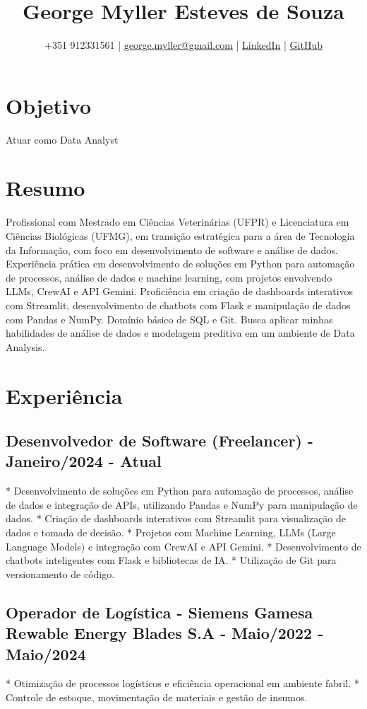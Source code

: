 \documentclass{article}
\title{George Myller Esteves de Souza}
\author{+351 912331561 | \href{mailto:george.myller@gmail.com}{george.myller@gmail.com} | \href{https://linkedin.com/in/george-m-souza}{LinkedIn} | \href{https://github.com/GeorgeMyller}{GitHub}}
\begin{document}
\maketitle

\section*{Objetivo}
 Atuar como Data Analyst

\section*{Resumo}
Profissional com Mestrado em Ciências Veterinárias (UFPR) e Licenciatura em Ciências Biológicas (UFMG), em transição estratégica para a área de Tecnologia da Informação, com foco em desenvolvimento de software e análise de dados. Experiência prática em desenvolvimento de soluções em Python para automação de processos, análise de dados e machine learning, com projetos envolvendo LLMs, CrewAI e API Gemini.  Proficiência em criação de dashboards interativos com Streamlit, desenvolvimento de chatbots com Flask e manipulação de dados com Pandas e NumPy.  Domínio básico de SQL e Git. Busca aplicar minhas habilidades de análise de dados e modelagem preditiva em um ambiente de Data Analysis.

\section*{Experiência}
\subsection*{Desenvolvedor de Software (Freelancer) - Janeiro/2024 - Atual}
* Desenvolvimento de soluções em Python para automação de processos, análise de dados e integração de APIs, utilizando Pandas e NumPy para manipulação de dados.
* Criação de dashboards interativos com Streamlit para visualização de dados e tomada de decisão.
* Projetos com Machine Learning, LLMs (Large Language Models) e integração com CrewAI e API Gemini.
* Desenvolvimento de chatbots inteligentes com Flask e bibliotecas de IA.
* Utilização de Git para versionamento de código.
\subsection*{Operador de Logística - Siemens Gamesa Rewable Energy Blades S.A - Maio/2022 - Maio/2024}
* Otimização de processos logísticos e eficiência operacional em ambiente fabril.
* Controle de estoque, movimentação de materiais e gestão de insumos.
\end{document}
